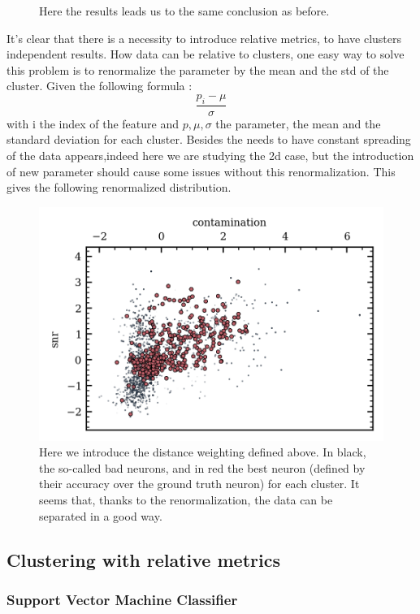 \documentclass[11pt,a4paper]{report}
\begin{document}
\begin{multicols}{2}
\begin{figure}[H]
        \caption{Here the results leads us to the same conclusion as before.}
        \label{}
    \end{figure}
    It's clear that there is a necessity to introduce relative metrics, to have clusters independent results. How data can be relative to clusters,
    one easy way to solve this problem is to renormalize the parameter by the mean and the std of the cluster. Given the following formula :
    $$\frac{p_i - \mu}{\sigma}$$ with i the index of the feature and $p,\mu,\sigma$ the parameter, the mean and the standard deviation for each cluster. Besides the needs
    to have constant spreading of the data appears,indeed here we are studying the 2d case, but the introduction of new parameter should cause some
    issues without this renormalization. This gives the following renormalized distribution.

    \begin{figure}[H]
        \centering
        \includegraphics[width=0.9\linewidth]{figure/clusters_weights.png}
        \caption{Here we introduce the distance weighting defined above. In black, the so-called bad neurons, and in red the best neuron (defined by their accuracy over the ground truth neuron) for each cluster.
            It seems that, thanks to the renormalization, the data can be separated in a good way.}
        \label{}

    \end{figure}

    \subsection{Clustering with relative metrics}
    \subsubsection{Support Vector Machine Classifier}


\end{multicols}
\end{document}
